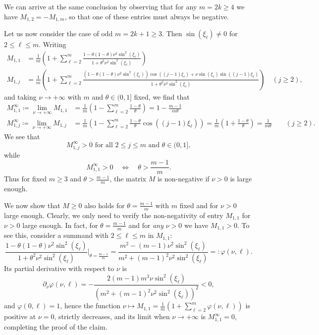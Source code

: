 \documentclass[a4paper]{article}
\newtheorem{remark}{Remark}
\newcommand{\te}{\theta}
\begin{document}
\begin{description}[style=unboxed,leftmargin=0cm]
We can arrive at the same conclusion by observing that
for any $m=2k\ge 4$ we have $M_{1,2}=-M_{1,m}$, so that one of
these entries must always be negative.
\item [{Case 2:} $m$ is {odd}.]
\item \noindent Let us now consider the case of {odd} $m=2k+1\ge 3$. Then $\sin(\xi_\ell)\ne0$ for
$2\le\ell\le m$.
 Writing
\begin{align*} 
	M_{1,1} & = \frac{1}{m} \left(1 + \sum_{\ell=2}^{m} \frac{1-\theta(1-\theta)\nu^2\sin^2(\xi_\ell)}
		{1+\theta^2\nu^2\sin^2(\xi_\ell)}\right) \\
	M_{1,j} & = \frac{1}{m} \left(1 + \sum_{\ell=2}^{m} \frac{(1-\theta(1-\theta)\nu^2\sin^2(\xi_\ell))
		\cos((j-1)\xi_\ell) + \nu \sin(\xi_\ell)\sin((j-1)\xi_\ell)}{1+\theta^2\nu^2 \sin^2(\xi_\ell)}
		\right) \quad (j\ge 2),
\end{align*}
and taking $\nu \to +\infty$ with $m$ and $\te\in(0,1]$ fixed, we find that
\begin{align*} 
    M_{1,1}^\infty \coloneqq \lim_{\nu \to +\infty} M_{1,1} & = \frac{1}{m} \left(1 - \sum_{\ell=2}^m \frac{1-\theta}{\theta}\right) =  1-\frac{m-1}{m\theta}\\
    M_{1,j}^\infty \coloneqq \lim_{\nu \to +\infty} M_{1,j} & = \frac{1}{m} \left(1 - \sum_{\ell=2}^m \frac{1-\theta}{\theta}\cos((j-1)\xi_\ell)\right) = \frac{1}{m} \left(1+\frac{1-\theta}{\theta}\right) = \frac{1}{m\theta} \quad\quad (j\ge 2).
\end{align*}
We see that
\[M_{1,j}^\infty>0 \text{ for all } 2\le j\le m \text{ and } \te\in(0,1],
\]
 while 
\[M_{1,1}^\infty>0 \quad\Longleftrightarrow\quad \theta>\frac{m-1}{m}.
\]
Thus for fixed $m\ge 3$ and $\theta>\frac{m-1}{m}$, the matrix $M$ is non-negative 
if $\nu>0$ is large enough.

We now show that $M\ge 0$ also holds for $\theta=\frac{m-1}{m}$ with $m$ fixed and for $\nu>0$ large enough. 
Clearly, we only need to verify the non-negativity of entry $M_{1,1}$ for $\nu>0$ large enough. 
In fact, for $\theta=\frac{m-1}{m}$ and for \emph{any} $\nu>0$ we have $M_{1,1}> 0$. To see this, consider a summand with $2\le\ell\le m$ in $M_{1,1}$: 
\[
 \frac{1-\theta(1-\theta)\nu^2\sin^2(\xi_\ell)}{1+\theta^2\nu^2\sin^2(\xi_\ell)}\Big|_{\theta=\frac{m-1}{m}}=
 \frac{m^2-(m-1) \nu ^2 \sin ^2\left(\xi _\ell\right)}{m^2+(m-1)^2 \nu ^2 \sin ^2\left(\xi _\ell\right)}=:\varphi(\nu,\ell).
\]
Its partial derivative with respect to $\nu$ is
\[
\partial_\nu\varphi(\nu,\ell)=-\frac{2 (m-1) m^3 \nu  \sin ^2\left(\xi _\ell\right)}{\left(m^2+(m-1)^2 \nu ^2 \sin ^2\left(\xi _\ell\right)\right)^2}<0,
\]
and $\varphi(0,\ell)=1$, hence the function $\nu\mapsto M_{1,1}=\frac{1}{m} \left(1 + \sum_{\ell=2}^{m} \varphi(\nu,\ell)\right)$ is positive at $\nu=0$, strictly decreases, and its limit when $\nu\to +\infty$ is $M_{1,1}^\infty=0$, completing the proof of the claim.\\


\end{description}
\end{document}
